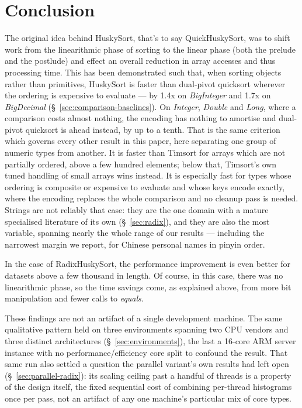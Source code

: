 \documentclass[twoside,leqno,twocolumn]{article}
\begin{document}
\section{Conclusion}

The original idea behind HuskySort, that's to say QuickHuskySort,
was to shift work from the linearithmic phase of sorting to the linear phase (both the prelude and the postlude)
and effect an overall reduction in array accesses and thus processing time.
\label{sec:conclusion-dp}%
This has been demonstrated such that, when sorting objects rather than primitives,
HuskySort is faster than dual-pivot quicksort wherever the ordering is expensive to evaluate ---
by 1.4x on \textit{BigInteger} and 1.7x on \textit{BigDecimal} (\S~\ref{sec:comparison-baselines}).
On \textit{Integer}, \textit{Double} and \textit{Long}, where a comparison costs almost nothing,
the encoding has nothing to amortise and dual-pivot quicksort is ahead instead, by up to a tenth.
That is the same criterion which governs every other result in this paper,
here separating one group of numeric types from another.
It is faster than Timsort for arrays which are not partially ordered, above a few hundred elements;
below that, Timsort's own tuned handling of small arrays wins instead.
It is especially fast for types whose ordering is composite or expensive to evaluate
and whose keys encode exactly, where the encoding replaces the whole comparison and no cleanup pass is needed.
Strings are not reliably that case:
they are the one domain with a mature specialised literature of its own (\S~\ref{sec:radix}),
and they are also the most variable, spanning nearly the whole range of our results ---
including the narrowest margin we report, for Chinese personal names in pinyin order.

In the case of RadixHuskySort, the performance improvement is even better for datasets above a few thousand in length.
Of course, in this case, there was no linearithmic phase, so the time savings come, as explained above,
from more bit manipulation and fewer calls to \textit{equals}.

These findings are not an artifact of a single development machine.
The same qualitative pattern held on three environments spanning two CPU vendors and three distinct architectures
(\S~\ref{sec:environments}),
the last a 16-core ARM server instance with no performance/efficiency core split to confound the result.
That same run also settled a question the parallel variant's own results had left open (\S~\ref{sec:parallel-radix}):
its scaling ceiling past a handful of threads is a property of the design itself,
the fixed sequential cost of combining per-thread histograms once per pass,
not an artifact of any one machine's particular mix of core types.
\end{document}
